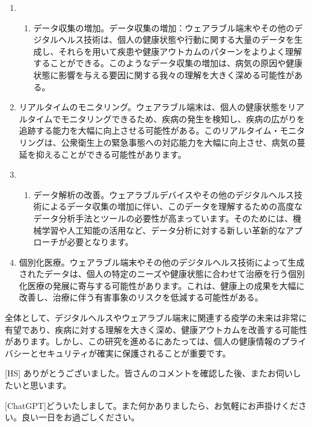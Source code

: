 \documentclass[
]{bxjsbook}
\providecommand{\tightlist}{%
  \setlength{\itemsep}{0pt}\setlength{\parskip}{0pt}}
\theoremstyle{definition}
\theoremstyle{definition}
\theoremstyle{definition}
\theoremstyle{definition}
\theoremstyle{remark}
\begin{document}
\begin{enumerate}
\def\labelenumi{\arabic{enumi}.}
\item
  \begin{enumerate}
  \def\labelenumii{\arabic{enumii}.}
  \tightlist
  \item
    データ収集の増加。データ収集の増加：ウェアラブル端末やその他のデジタルヘルス技術は、個人の健康状態や行動に関する大量のデータを生成し、それらを用いて疾患や健康アウトカムのパターンをよりよく理解することができる。このようなデータ収集の増加は、病気の原因や健康状態に影響を与える要因に関する我々の理解を大きく深める可能性がある。
  \end{enumerate}
\item
  リアルタイムのモニタリング。ウェアラブル端末は、個人の健康状態をリアルタイムでモニタリングできるため、疾病の発生を検知し、疾病の広がりを追跡する能力を大幅に向上させる可能性がある。このリアルタイム・モニタリングは、公衆衛生上の緊急事態への対応能力を大幅に向上させ、病気の蔓延を抑えることができる可能性があります。
\item
  \begin{enumerate}
  \def\labelenumii{\arabic{enumii}.}
  \setcounter{enumii}{2}
  \tightlist
  \item
    データ解析の改善。ウェアラブルデバイスやその他のデジタルヘルス技術によるデータ収集の増加に伴い、このデータを理解するための高度なデータ分析手法とツールの必要性が高まっています。そのためには、機械学習や人工知能の活用など、データ分析に対する新しい革新的なアプローチが必要となります。
  \end{enumerate}
\item
  個別化医療。ウェアラブル端末やその他のデジタルヘルス技術によって生成されたデータは、個人の特定のニーズや健康状態に合わせて治療を行う個別化医療の発展に寄与する可能性があります。これは、健康上の成果を大幅に改善し、治療に伴う有害事象のリスクを低減する可能性がある。
\end{enumerate}

全体として、デジタルヘルスやウェアラブル端末に関連する疫学の未来は非常に有望であり、疾病に対する理解を大きく深め、健康アウトカムを改善する可能性があります。しかし、この研究を進めるにあたっては、個人の健康情報のプライバシーとセキュリティが確実に保護されることが重要です。

{[}HS{]} ありがとうございました。皆さんのコメントを確認した後、またお伺いしたいと思います。

{[}ChatGPT{]}どういたしまして。また何かありましたら、お気軽にお声掛けください。良い一日をお過ごしください。
\end{document}
